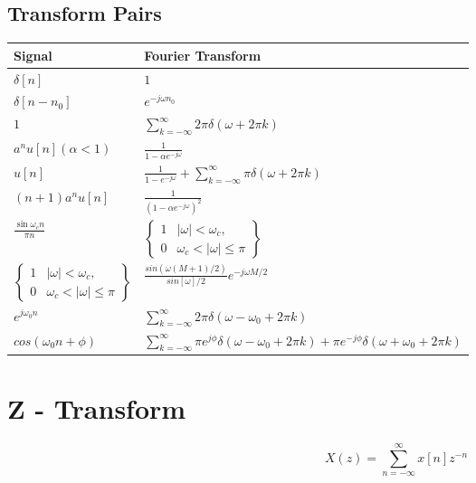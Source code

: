 \documentclass{article}
\begin{document}
\subsection*{Transform Pairs}
\begin{center}
    \begin{tabularx}{\textwidth}{XX}
        \hline
        Signal & Fourier Transform\\
        \hline
        $\delta[n]$ & $1$\\
        $\delta[n-n_0]$ & $e^{-j\omega n_0}$\\
        $1$ & $\sum_{k=-\infty}^{\infty}{2\pi \delta(\omega+2\pi k)}$\\
        $a^nu[n] (\alpha < 1)$ & $\frac{1}{1-\alpha e^{-j\omega}}$\\
        $u[n]$ & $\frac{1}{1 - e^{-j\omega}}+\sum_{k=-\infty}^{\infty}{\pi \delta(\omega+2\pi k)}$\\
        $(n+1)a^nu[n]$ & $\frac{1}{(1-\alpha e^{-j\omega})^2}$\\
        $\frac{\sin \omega_c n}{\pi n}$ & $\left\{
            \begin{array}{cc}
                1 & |\omega|<\omega_c,\\
                0 & \omega_c < |\omega| \le \pi 
            \end{array}
            \right\}$\\
        $\left\{
            \begin{array}{cc}
                1 & |\omega|<\omega_c,\\
                0 & \omega_c < |\omega| \le \pi 
            \end{array}
            \right\}$ & $\frac{sin(\omega(M+1)/2)}{sin[\omega]/2}e^{-j\omega M/2}$\\
        $e^{j\omega_0 n}$ & $\sum_{k=-\infty}^{\infty}{2\pi \delta(\omega - \omega_0+2\pi k)}$\\
        $cos(\omega_0 n+\phi)$ & $\sum_{k=-\infty}^{\infty}{\pi e^{j\phi}\delta(\omega - \omega_0+2\pi k)+\pi e^{-j\phi}\delta(\omega + \omega_0+2\pi k)}$
    \end{tabularx}
\end{center}
\pagebreak
\section*{Z - Transform}
$$X(z) = \sum_{n=-\infty}^{\infty}{x[n]z^{-n}}$$
\end{document}
